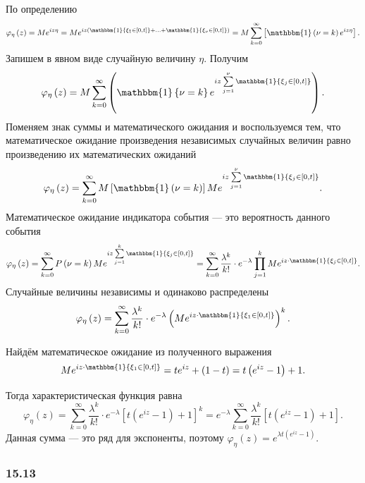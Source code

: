 По определению
$$ \varphi_{ \eta } \left( z \right) =
Me^{iz \eta } =
Me^{iz \left( \mathbbm{1} \left\{ \xi_1 \in \left[ 0, t \right] \right\} + \dotsc + \mathbbm{1} \left\{ \xi_{ \nu } \in \left[ 0, t \right] \right\} \right) } =
M \sum \limits_{k = 0}^{ \infty } \left[ \mathbbm{1} \left( \nu = k \right) e^{iz \eta } \right].$$
Запишем в явном виде случайную величину $ \eta $.
Получим
$$ \varphi_{ \eta } \left( z \right) =
M \sum \limits_{k = 0}^{ \infty } \left( \mathbbm{1} \left\{ \nu = k \right\}
e^{iz \sum \limits_{j = 1}^{ \nu } \mathbbm{1} \left\{ \xi_j \in \left[ 0, t \right] \right\} } \right).$$
Поменяем знак суммы и математического ожидания и воспользуемся тем,
что математическое ожидание произведения независимых случайных величин равно произведению их математических ожиданий
$$ \varphi_{ \eta } \left( z \right) =
\sum \limits_{k = 0}^{ \infty } M \left[ \mathbbm{1} \left( \nu = k \right) \right]
Me^{iz \sum \limits_{j = 1}^{ \nu } \mathbbm{1} \left\{ \xi_j \in \left[ 0, t \right] \right\} }.$$
Математическое ожидание индикатора события --- это вероятность данного события
$$ \varphi_{ \eta } \left( z \right) =
\sum \limits_{k = 0}^{ \infty } P \left( \nu = k \right) Me^{iz \sum \limits_{j = 1}^k \mathbbm{1} \left\{ \xi_j \in \left[ 0, t \right] \right\} } =
\sum \limits_{k = 0}^{ \infty } \frac{ \lambda^k}{k!} \cdot e^{- \lambda }
\prod \limits_{j = 1}^k Me^{iz \cdot \mathbbm{1} \left\{ \xi_j \in \left[ 0, t \right] \right\} }.$$
Случайные величины независимы и одинаково распределены
$$  \varphi_{ \eta } \left( z \right) =
\sum \limits_{k = 0}^{ \infty } \frac{ \lambda^k}{k!} \cdot e^{- \lambda} \left( Me^{iz \cdot \mathbbm{1} \left\{ \xi_1 \in \left[ 0, t \right] \right\} } \right)^k.$$

Найдём математическое ожидание из полученного выражения
$$Me^{iz \cdot \mathbbm{1} \left\{ \xi_1 \in \left[ 0, t \right] \right\} } =
te^{iz} + \left( 1 - t \right) =
t \left( e^{iz} - 1 \right) + 1.$$

Тогда характеристическая функция равна
$$ \varphi_{ \eta } \left( z \right) =
\sum \limits_{k = 0}^{ \infty } \frac{ \lambda^k}{k!} \cdot e^{- \lambda } \left[ t \left( e^{iz} - 1 \right) + 1 \right]^k =
e^{- \lambda } \sum \limits_{k = 0}^{ \infty } \frac{ \lambda^k}{k!} \left[ t \left( e^{iz} - 1 \right) + 1 \right].$$
Данная сумма --- это ряд для экспоненты, поэтому $ \varphi_{ \eta } \left( z \right) = e^{ \lambda t \left( e^{iz} - 1 \right) }$.

\subsubsection*{15.13}

